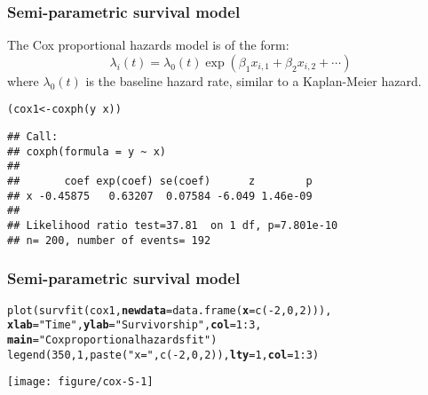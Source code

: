 \documentclass[color=usenames,dvipsnames]{beamer}\usepackage[]{graphicx}\usepackage[]{xcolor}
\makeatletter
\newcommand{\hlnum}[1]{\textcolor[rgb]{0.69,0.494,0}{#1}}%
\newcommand{\hlsng}[1]{\textcolor[rgb]{0.749,0.012,0.012}{#1}}%
\newcommand{\hlopt}[1]{\textcolor[rgb]{0,0,0}{#1}}%
\newcommand{\hldef}[1]{\textcolor[rgb]{0,0,0}{#1}}%
\newcommand{\hlkwb}[1]{\textcolor[rgb]{0,0.341,0.682}{#1}}%
\newcommand{\hlkwc}[1]{\textcolor[rgb]{0,0,0}{\textbf{#1}}}%
\newcommand{\hlkwd}[1]{\textcolor[rgb]{0.004,0.004,0.506}{#1}}%
\newenvironment{kframe}{%
 \def\at@end@of@kframe{}%
 \ifinner\ifhmode%
  \def\at@end@of@kframe{\end{minipage}}%
  \begin{minipage}{\columnwidth}%
 \fi\fi%
 \def\FrameCommand##1{\hskip\@totalleftmargin \hskip-\fboxsep
 \colorbox{shadecolor}{##1}\hskip-\fboxsep
     \hskip-\linewidth \hskip-\@totalleftmargin \hskip\columnwidth}%
 \MakeFramed {\advance\hsize-\width
   \@totalleftmargin\z@ \linewidth\hsize
   \@setminipage}}%
 {\par\unskip\endMakeFramed%
 \at@end@of@kframe}
\newenvironment{knitrout}{}{} %
\makeatother
\begin{document}
\begin{frame}[fragile]
  \frametitle{Semi-parametric survival model}
  The Cox proportional hazards model is of the form:
  \[
    \lambda_i(t) = \lambda_0(t)\exp(\beta_1 x_{i,1} + \beta_2 x_{i,2} + \cdots)
  \]
  where $\lambda_0(t)$ is the baseline hazard rate, similar to a
  Kaplan-Meier hazard.
  \pause \vfill
\begin{knitrout}\scriptsize
{}\color{fgcolor}\begin{kframe}
\begin{alltt}
\hldef{(cox1} \hlkwb{<-} \hlkwd{coxph}\hldef{(y} \hlopt{~} \hldef{x))}
\end{alltt}
\begin{verbatim}
## Call:
## coxph(formula = y ~ x)
## 
##       coef exp(coef) se(coef)      z        p
## x -0.45875   0.63207  0.07584 -6.049 1.46e-09
## 
## Likelihood ratio test=37.81  on 1 df, p=7.801e-10
## n= 200, number of events= 192
\end{verbatim}
\end{kframe}
\end{knitrout}
\end{frame}




\begin{frame}[fragile]
  \frametitle{Semi-parametric survival model}
\begin{knitrout}\scriptsize
{}\color{fgcolor}\begin{kframe}
\begin{alltt}
\hlkwd{plot}\hldef{(}\hlkwd{survfit}\hldef{(cox1,} \hlkwc{newdata}\hldef{=}\hlkwd{data.frame}\hldef{(}\hlkwc{x}\hldef{=}\hlkwd{c}\hldef{(}\hlopt{-}\hlnum{2}\hldef{,}\hlnum{0}\hldef{,}\hlnum{2}\hldef{))),}
     \hlkwc{xlab}\hldef{=}\hlsng{"Time"}\hldef{,} \hlkwc{ylab}\hldef{=}\hlsng{"Survivorship"}\hldef{,} \hlkwc{col}\hldef{=}\hlnum{1}\hlopt{:}\hlnum{3}\hldef{,}
     \hlkwc{main}\hldef{=}\hlsng{"Cox proportional hazards fit"}\hldef{)}
\hlkwd{legend}\hldef{(}\hlnum{350}\hldef{,} \hlnum{1}\hldef{,} \hlkwd{paste}\hldef{(}\hlsng{"x ="}\hldef{,} \hlkwd{c}\hldef{(}\hlopt{-}\hlnum{2}\hldef{,} \hlnum{0}\hldef{,} \hlnum{2}\hldef{)),} \hlkwc{lty}\hldef{=}\hlnum{1}\hldef{,} \hlkwc{col}\hldef{=}\hlnum{1}\hlopt{:}\hlnum{3}\hldef{)}
\end{alltt}
\end{kframe}

{\centering \texttt{[image: figure/cox-S-1]} 

}


\end{knitrout}
\end{frame}
\end{document}
